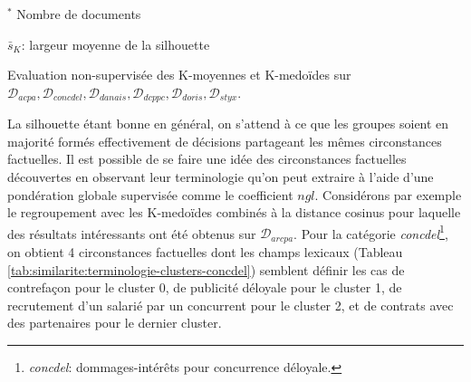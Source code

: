 \begin{table}[!htb]
	$^*$ Nombre de documents
	
$\bar{s}_K$: largeur moyenne de la silhouette

	\caption{Evaluation non-supervisée des K-moyennes et K-medoïdes sur $\mathcal{D}_{acpa}, \mathcal{D}_{concdel}, \mathcal{D}_{danais}, \mathcal{D}_{dcppc}, \mathcal{D}_{doris}, \mathcal{D}_{styx}$.} \label{tab:similarite:validation-nonsupervisee}
\end{table}

La silhouette étant bonne en général, on s'attend à ce que les groupes soient en majorité formés effectivement de décisions partageant les mêmes circonstances factuelles. Il est possible de se faire une idée des circonstances factuelles découvertes en observant leur terminologie qu'on peut extraire à l'aide d'une pondération globale supervisée comme le coefficient $ngl$. Considérons par exemple le regroupement avec les K-medoïdes combinés à la distance cosinus pour laquelle des résultats intéressants ont été obtenus sur $\mathcal{D}_{arcpa}$. Pour la catégorie \textit{concdel}\footnote{\textit{concdel}: dommages-intérêts pour concurrence déloyale.}, on obtient 4 circonstances factuelles dont les champs lexicaux (Tableau \ref{tab:similarite:terminologie-clusters-concdel}) semblent définir les cas de contrefaçon pour le cluster 0, de publicité déloyale pour le cluster 1, de recrutement d'un salarié par un concurrent pour le cluster 2, et de contrats avec des partenaires pour le dernier cluster.



